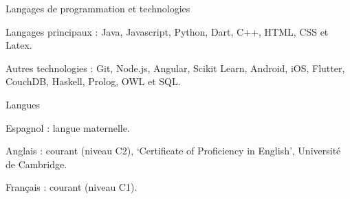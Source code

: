 

\begin{cventries}

\cventry
{Langages de programmation et technologies} %
{} %
{} %
{} %
{
  \begin{cvitems} %
    \item Langages principaux : Java, Javascript, Python, Dart, C++, HTML, CSS et Latex.
    \item Autres technologies : Git, Node.js, Angular, Scikit Learn, Android, iOS, Flutter, CouchDB, Haskell, Prolog, OWL et SQL.
  \end{cvitems}
}

\cventry
{Langues} %
{} %
{} %
{} %
{
  \begin{cvitems} %
    \item Espagnol : langue maternelle. 
    \item Anglais : courant (niveau C2), `Certificate of Proficiency in English', Université de Cambridge.
    \item Français : courant (niveau C1).
  \end{cvitems}
}

\end{cventries}
